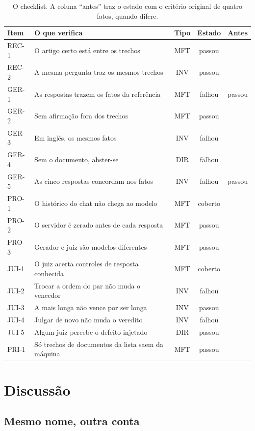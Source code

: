 \documentclass[12pt]{article}
\begin{document}
\begin{table}[htb]
\centering
\small
\caption{O checklist. A coluna ``antes'' traz o estado com o critério original de
quatro fatos, quando difere.}
\label{tab:checklist}
\begin{tabular}{@{}lL{8.1cm}ccc@{}}
\toprule
Item & O que verifica & Tipo & Estado & Antes \\
\midrule
REC-1 & O artigo certo está entre os trechos & MFT & passou & \\
REC-2 & A mesma pergunta traz os mesmos trechos & INV & passou & \\
GER-1 & As respostas trazem os fatos da referência & MFT & falhou & passou \\
GER-2 & Sem afirmação fora dos trechos & MFT & passou & \\
GER-3 & Em inglês, os mesmos fatos & INV & falhou & \\
GER-4 & Sem o documento, abster-se & DIR & falhou & \\
GER-5 & As cinco respostas concordam nos fatos & INV & falhou & passou \\
PRO-1 & O histórico do chat não chega ao modelo & MFT & coberto & \\
PRO-2 & O servidor é zerado antes de cada resposta & MFT & passou & \\
PRO-3 & Gerador e juiz são modelos diferentes & MFT & passou & \\
JUI-1 & O juiz acerta controles de resposta conhecida & MFT & coberto & \\
JUI-2 & Trocar a ordem do par não muda o vencedor & INV & falhou & \\
JUI-3 & A mais longa não vence por ser longa & INV & passou & \\
JUI-4 & Julgar de novo não muda o veredito & INV & falhou & \\
JUI-5 & Algum juiz percebe o defeito injetado & DIR & passou & \\
PRI-1 & Só trechos de documentos da lista saem da máquina & MFT & passou & \\
\bottomrule
\end{tabular}
\end{table}

\section{Discussão}

\subsection{Mesmo nome, outra conta}
\end{document}

